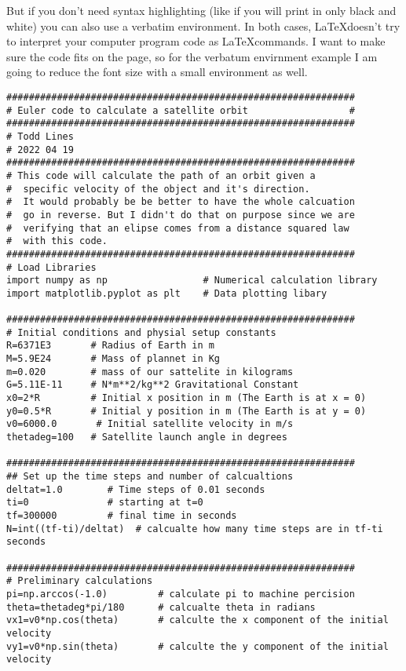 But if you don't need syntax highlighting (like if you will print in only black and white) you can also use a verbatim environment. In both cases, \LaTeX \enspace doesn't try to interpret your computer program code as \LaTeX \enspace commands. I want to make sure the code fits on the page, so for the verbatum envirnment example I am going to reduce the font size with a small environment as well. 
\begin{small}
\begingroup
\makeatletter
\@totalleftmargin=-1cm
	\begin{verbatim}
##############################################################
# Euler code to calculate a satellite orbit                  #
##############################################################
# Todd Lines
# 2022 04 19
##############################################################
# This code will calculate the path of an orbit given a 
#  specific velocity of the object and it's direction. 
#  It would probably be be better to have the whole calcuation 
#  go in reverse. But I didn't do that on purpose since we are
#  verifying that an elipse comes from a distance squared law
#  with this code.
##############################################################
# Load Libraries
import numpy as np                 # Numerical calculation library
import matplotlib.pyplot as plt    # Data plotting libary

##############################################################
# Initial conditions and physial setup constants
R=6371E3       # Radius of Earth in m
M=5.9E24       # Mass of plannet in Kg
m=0.020        # mass of our sattelite in kilograms
G=5.11E-11     # N*m**2/kg**2 Gravitational Constant
x0=2*R         # Initial x position in m (The Earth is at x = 0)
y0=0.5*R       # Initial y position in m (The Earth is at y = 0)
v0=6000.0       # Initial satellite velocity in m/s
thetadeg=100   # Satellite launch angle in degrees

##############################################################
## Set up the time steps and number of calcualtions
deltat=1.0        # Time steps of 0.01 seconds
ti=0              # starting at t=0
tf=300000         # final time in seconds
N=int((tf-ti)/deltat)  # calcualte how many time steps are in tf-ti seconds

##############################################################
# Preliminary calculations
pi=np.arccos(-1.0)         # calculate pi to machine percision
theta=thetadeg*pi/180      # calcualte theta in radians
vx1=v0*np.cos(theta)       # calculte the x component of the initial velocity
vy1=v0*np.sin(theta)       # calculte the y component of the initial velocity


\end{verbatim}
\end{small}
